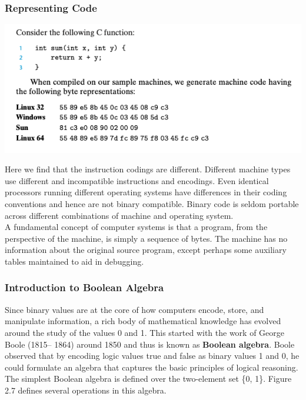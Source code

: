 \documentclass[11pt]{article}
\begin{document}
\subsubsection{Representing Code}
\label{sec:org7770303}

\begin{center}
\includegraphics[width=.9\linewidth]{pics/representing-code.png}
\end{center}


Here we find that the instruction codings are different. Different machine types use different and incompatible instructions and encodings. Even identical processors running different operating systems have differences in their coding conventions and hence are not binary compatible. Binary code is seldom portable across different combinations of machine and operating system.\\

A fundamental concept of computer systems is that a program, from the perspective of the machine, is simply a sequence of bytes. The machine has no information about the original source program, except perhaps some auxiliary tables maintained to aid in debugging.\\

\subsubsection{Introduction to Boolean Algebra}
\label{sec:orgbf43d1d}
Since binary values are at the core of how computers encode, store, and manipulate information, a rich body of mathematical knowledge has evolved around the study of the values 0 and 1. This started with the work of George Boole (1815– 1864) around 1850 and thus is known as \textbf{Boolean algebra}. Boole observed that by encoding logic values true and false as binary values 1 and 0, he could formulate an algebra that captures the basic principles of logical reasoning.\\

The simplest Boolean algebra is defined over the two-element set \{0, 1\}. Figure 2.7 defines several operations in this algebra.\\
\end{document}
